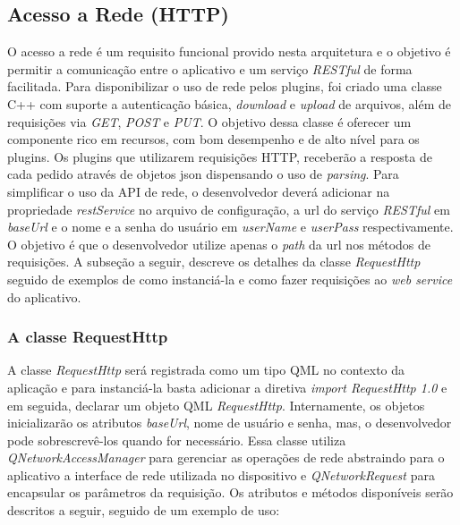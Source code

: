 \subsection{Acesso a Rede (HTTP)}\label{sec:solucao-desenvolvida}
O acesso a rede é um requisito funcional provido nesta arquitetura e o objetivo é permitir a comunicação entre o aplicativo e um serviço \textit{RESTful} de forma facilitada. Para disponibilizar o uso de rede pelos plugins, foi criado uma classe C++ com suporte a autenticação básica, \textit{download} e \textit{upload} de arquivos, além de requisições via \textit{GET}, \textit{POST} e \textit{PUT}. O objetivo dessa classe é oferecer um componente rico em recursos, com bom desempenho e de alto nível para os plugins. Os plugins que utilizarem requisições HTTP, receberão a resposta de cada pedido através de objetos json dispensando o uso de \textit{parsing}. Para simplificar o uso da API de rede, o desenvolvedor deverá adicionar na propriedade \textit{restService} no arquivo de configuração, a url do serviço \textit{RESTful} em \textit{baseUrl} e o nome e a senha do usuário em \textit{userName} e \textit{userPass} respectivamente. O objetivo é que o desenvolvedor utilize apenas o \textit{path} da url nos métodos de requisições. A subseção a seguir, descreve os detalhes da classe \textit{RequestHttp} seguido de exemplos de como instanciá-la e como fazer requisições ao \textit{web service} do aplicativo.

\subsubsection{A classe RequestHttp}\label{sec:solucao-desenvolvida}
A classe \textit{RequestHttp} será registrada como um tipo QML no contexto da aplicação e para instanciá-la basta adicionar a diretiva \textit{import RequestHttp 1.0} e em seguida, declarar um objeto QML \textit{RequestHttp}. Internamente, os objetos inicializarão os atributos \textit{baseUrl}, nome de usuário e senha, mas, o desenvolvedor pode sobrescrevê-los quando for necessário. Essa classe utiliza \textit{QNetworkAccessManager} para gerenciar as operações de rede abstraindo para o aplicativo a interface de rede utilizada no dispositivo e \textit{QNetworkRequest} para encapsular os parâmetros da requisição. Os atributos e métodos disponíveis serão descritos a seguir, seguido de um exemplo de uso:

